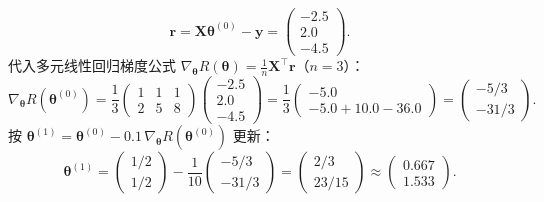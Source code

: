 \begin{exercise}[title={梯度向量手算与一步梯度下降更新},level=standard,points=15,tags={梯度下降,梯度推导,手算}]
\begin{solution}
\begin{enumerate}
\[    \bm{r} = \bm{X}\bm{\theta}^{(0)} - \bm{y} = \begin{pmatrix} -2.5 \\ 2.0 \\ -4.5 \end{pmatrix}.
  \]
  代入多元线性回归梯度公式 $\nabla_{\bm{\theta}}R(\bm{\theta}) = \frac{1}{n}\bm{X}^\top\bm{r}$（$n=3$）：
  \[
    \nabla_{\bm{\theta}}R(\bm{\theta}^{(0)})
    = \frac{1}{3}\begin{pmatrix} 1 & 1 & 1 \\ 2 & 5 & 8 \end{pmatrix}\begin{pmatrix} -2.5 \\ 2.0 \\ -4.5 \end{pmatrix}
    = \frac{1}{3}\begin{pmatrix} -5.0 \\ -5.0 + 10.0 - 36.0 \end{pmatrix}
    = \begin{pmatrix} -5/3 \\ -31/3 \end{pmatrix}.
  \]
  按 $\bm{\theta}^{(1)} = \bm{\theta}^{(0)} - 0.1\,\nabla_{\bm{\theta}}R(\bm{\theta}^{(0)})$ 更新：
  \[
    \bm{\theta}^{(1)} = \begin{pmatrix} 1/2 \\ 1/2 \end{pmatrix} - \frac{1}{10}\begin{pmatrix} -5/3 \\ -31/3 \end{pmatrix} = \begin{pmatrix} 2/3 \\ 23/15 \end{pmatrix} \approx \begin{pmatrix} 0.667 \\ 1.533 \end{pmatrix}.
  \]
\end{enumerate}
\end{solution}
\end{exercise}

